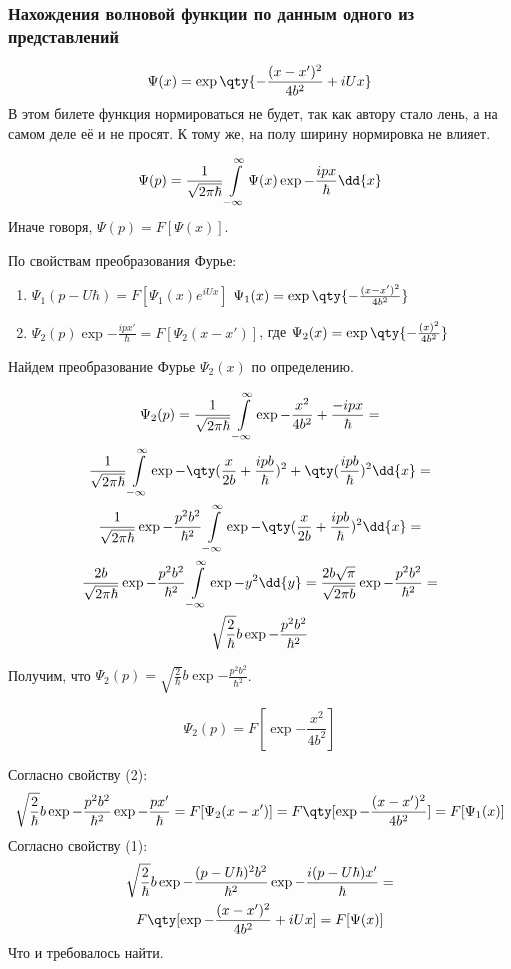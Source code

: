\subsubsection{Нахождения волновой функции по данным одного из представлений}

$$\Psi(x)=\exp \qty{-\frac{(x-x')^2}{4b^2}+iUx} $$
В этом билете функция нормироваться не будет, так как автору стало лень, а на самом деле её и не просят. К тому же, на полу ширину нормировка не влияет.

$$\Psi(p)=\frac{1}{\sqrt{2\pi\hbar} } \infint \Psi(x) \exp{-\frac{ipx}{\hbar}}\dd{x} $$
Иначе говоря, $\Psi(p)=F[\Psi(x)]$.

По свойствам преобразования Фурье:  
\begin{enumerate}
	\item $\Psi_1(p-U\hbar)= F[\Psi_1(x)e^{iUx}]$ $\Psi_1(x)=\exp \qty{-\frac{(x-x')^2}{4b^2}}$
	\item $\Psi_2(p)\exp{-\frac{ipx'}{\hbar}}=F[\Psi_2(x-x')]$, где 
	$\Psi_2(x)=\exp \qty{-\frac{(x)^2}{4b^2}}$
\end{enumerate}

Найдем преобразование Фурье $\Psi_2(x)$ по определению.

\begin{gather*}
\Psi_2(p)=\frac{1}{\sqrt{2\pi\hbar}}\infint \exp{-\frac{x^2}{4b^2}+\frac{-ipx}{\hbar}}=\\
\frac{1}{\sqrt{2\pi\hbar}}\infint \exp{-\qty(\frac{x}{2b}+\frac{ipb}{\hbar})^2+
\qty(\frac{ipb}{\hbar})^2}\dd{x}= \\
\frac{1}{\sqrt{2\pi\hbar}}\exp{-\frac{p^2b^2}{\hbar^2}} 
\infint \exp{-\qty(\frac{x}{2b}+\frac{ipb}{\hbar})^2} \dd{x}=\\
\frac{2b}{\sqrt{2\pi\hbar}}\exp{-\frac{p^2b^2}{\hbar^2}} 
\infint \exp{-y^2}\dd{y}=\frac{2b\sqrt\pi}{\sqrt{2\pi b}}\exp{-\frac{p^2b^2}{\hbar^2}}=\\ 
\sqrt{\frac{2}{\hbar}}b\exp{-\frac{p^2b^2}{\hbar^2}}
\end{gather*}

Получим, что $\Psi_2(p)=\sqrt{\frac{2}{\hbar}}b\exp{-\frac{p^2b^2}{\hbar^2}}$.

$$\Psi_2(p)=F[\exp{-\frac{x^2}{4b^2}}]$$

Согласно свойству (2):
$$\sqrt{\frac{2}{\hbar}}b\exp{-\frac{p^2b^2}{\hbar^2}}\exp{-\frac{px'}{\hbar}}=
F[\Psi_2(x-x')]=F\qty[ \exp{-\frac{(x-x')^2}{4b^2}} ] = F[\Psi_1(x)]$$
Согласно свойству (1):
\begin{gather*}
\sqrt{\frac{2}{\hbar}}b\exp{-\frac{(p-U\hbar)^2b^2}{\hbar^2}}\exp{-\frac{i(p-U\hbar)x'}{\hbar}}=\\
 F\qty[\exp{-\frac{(x-x')^2}{4b^2}}+iUx]=F[\Psi(x)]
\end{gather*}
Что и требовалось найти.

